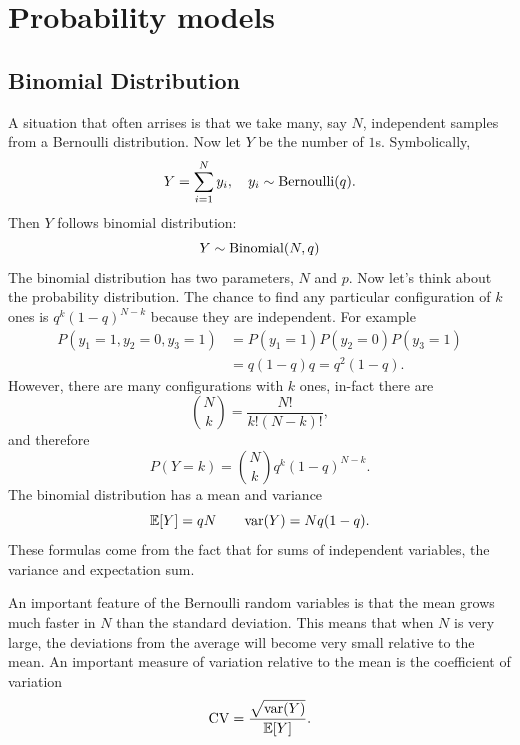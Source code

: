 
\chapter{Probability models}

  \section{Binomial Distribution}
A situation that often arrises is that we take many, say $N$, independent samples from a Bernoulli distribution. Now let $Y$ be the number of $1$s. Symbolically, 
\begin{equation}
Y = \sum_{i=1}^N y_i ,\quad y_i \sim {\rm Bernoulli}(q).
\end{equation}
 Then $Y$ follows {\dfn binomial distribution}:
\begin{equation}
Y \sim {\rm Binomial}(N,q)
\end{equation}
The binomial distribution has two parameters, $N$ and $p$. Now let's think about the probability distribution. The chance to find any particular configuration of $k$ ones is $q^k(1-q)^{N-k}$ because they are independent. For example
\begin{align}
P(y_1 = 1,y_2 = 0,y_3 = 1) &= P(y_1 = 1)P(y_2=0)P(y_3 =1) \\
&= q(1-q)q = q^2(1-q).
\end{align}
However, there are many configurations with $k$ ones, in-fact there are 
\begin{equation}
{N \choose k} = \frac{N!}{k!(N-k)!},
\end{equation}
and therefore 
\begin{equation}
P(Y=k) = {N \choose k}q^{k}(1-q)^{N-k}. 
\end{equation}
The binomial distribution has a mean and variance
\begin{equation}
\mathbb E[Y] = qN \quad\quad{\rm var}(Y) = Nq(1-q). 
\end{equation}
These formulas come from the fact that for sums of independent variables, the variance and expectation sum. 


 
 An important feature of the Bernoulli random variables is that the mean grows much faster in $N$ than the standard deviation. This means that when $N$ is very large, the deviations from the average will become very small relative to the mean. An important measure of variation relative to the mean is the coefficient of variation 
\begin{equation}
{\rm CV} = \frac{\sqrt{{\rm var}(Y)}}{\mathbb E[Y]}. 
\end{equation}

